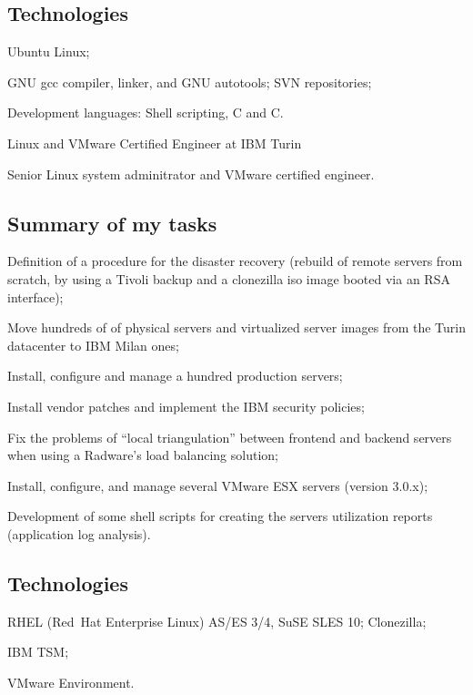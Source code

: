 \subsection{Technologies}

\item{\bdot} Ubuntu Linux;
\item{\bdot} GNU gcc compiler, linker, and GNU autotools; SVN repositories;
\item{\bdot} Development languages: Shell scripting, C and C\plusplus.

\bigskip
{}
   {Linux and VMware Certified Engineer at IBM Turin}

\noindent
Senior Linux system adminitrator and VMware certified engineer.

\subsection{Summary of my tasks}

\item{\bdot} Definition of a procedure for the disaster recovery 
   (rebuild of remote servers from scratch, by using a Tivoli backup and a 
    clonezilla iso image booted via an RSA interface);
\item{\bdot} Move hundreds of of physical servers and virtualized server 
   images from the Turin datacenter to IBM Milan ones;
\item{\bdot} Install, configure and manage a hundred production servers;
\item{\bdot} Install vendor patches and implement the IBM security policies;
\item{\bdot} Fix the problems of ``local triangulation'' between frontend 
   and backend servers when using a Radware's load balancing solution;
\item{\bdot} Install, configure, and manage several VMware ESX servers 
   (version 3.0.x);
\item{\bdot} Development of some shell scripts for creating the servers 
   utilization reports (application log analysis).

\subsection{Technologies}

\item{\bdot} RHEL (Red~Hat Enterprise Linux) AS/ES 3/4, SuSE SLES 10; Clonezilla;
\item{\bdot} IBM TSM;
\item{\bdot} VMware Environment.
 
